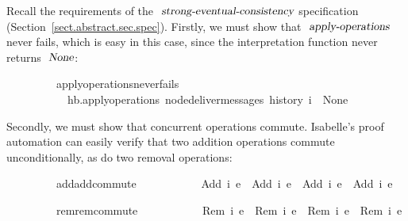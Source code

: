 \noindent 
Recall the requirements of the $\isa{strong-eventual-consistency}$ specification (Section~\ref{sect.abstract.sec.spec}).
Firstly, we must show that $\isa{apply-operations}$ never fails, which is easy in this case, since the interpretation function never returns $\isa{None}$:
\vspace{0.275em}
\begin{isabellebody}
\ \ \ \ \ \ \ \ \ apply{\isacharunderscore}operations{\isacharunderscore}never{\isacharunderscore}fails{\isacharcolon}\isanewline
\ \ \ \ \ \ \ \ \ \ \ {\isachardoublequoteopen}hb.apply{\isacharunderscore}operations\ {\isacharparenleft}node{\isacharunderscore}deliver{\isacharunderscore}messages\ {\isacharparenleft}history\ i{\isacharparenright}{\isacharparenright}\ {\isasymnoteq}\ None{\isachardoublequoteclose}
\end{isabellebody}
\vspace{0.275em}
\noindent Secondly, we must show that concurrent operations commute.
Isabelle's proof automation can easily verify that two addition operations commute unconditionally, as do two removal operations:
\vspace{0.275em}
\begin{isabellebody}
\ \ \ \ \ \ \ \ \ add{\isacharunderscore}add{\isacharunderscore}commute{\isacharcolon}\isanewline
\ \ \ \ \ \ \ \ \ \ \ {\isachardoublequoteopen}{\isasymlangle}Add\ i{}\ e{}{\isasymrangle}\ {\isasymrhd}\ {\isasymlangle}Add\ i{}\ e{}{\isasymrangle}\ {\isacharequal}\ {\isasymlangle}Add\ i{}\ e{}{\isasymrangle}\ {\isasymrhd}\ {\isasymlangle}Add\ i{}\ e{}{\isasymrangle}{\isachardoublequoteclose}
\end{isabellebody}
\vspace{0.275em}
\begin{isabellebody}
\ \ \ \ \ \ \ \ \ rem{\isacharunderscore}rem{\isacharunderscore}commute{\isacharcolon}\isanewline
\ \ \ \ \ \ \ \ \ \ \ {\isachardoublequoteopen}{\isasymlangle}Rem\ i{}\ e{}{\isasymrangle}\ {\isasymrhd}\ {\isasymlangle}Rem\ i{}\ e{}{\isasymrangle}\ {\isacharequal}\ {\isasymlangle}Rem\ i{}\ e{}{\isasymrangle}\ {\isasymrhd}\ {\isasymlangle}Rem\ i{}\ e{}{\isasymrangle}{\isachardoublequoteclose}
\end{isabellebody}
\vspace{0.275em}
